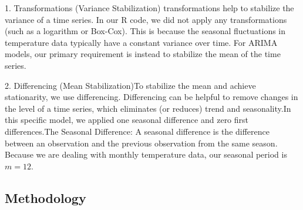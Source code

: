 \documentclass[11pt, a4paper]{article}\usepackage[]{graphicx}\usepackage[]{xcolor}
\begin{document}
1. Transformations (Variance Stabilization) transformations help to stabilize the variance of a time series. In our R code, we did not apply any transformations (such as a logarithm or Box-Cox). This is because the seasonal fluctuations in temperature data typically have a constant variance over time. For ARIMA models, our primary requirement is instead to stabilize the mean of the time series. 

2. Differencing (Mean Stabilization)To stabilize the mean and achieve stationarity, we use differencing. Differencing can be helpful to remove changes in the level of a time series, which eliminates (or reduces) trend and seasonality.In this specific model, we applied one seasonal difference and zero first differences.The Seasonal Difference: A seasonal difference is the difference between an observation and the previous observation from the same season. Because we are dealing with monthly temperature data, our seasonal period is $m=12$. 

\subsection{Methodology}
\end{document}
